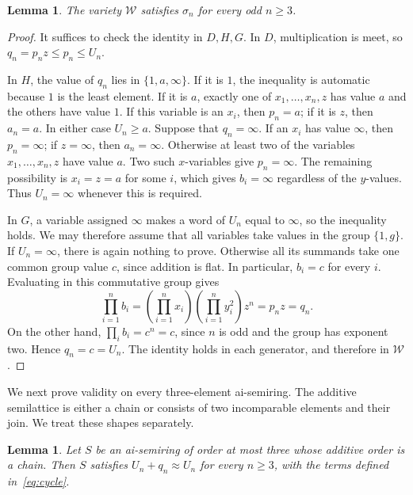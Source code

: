 \documentclass[11pt,reqno]{amsart}
\numberwithin{equation}{section}
\newtheorem{lemma}[theorem]{Lemma}
\theoremstyle{definition}
\theoremstyle{remark}
\newcommand{\W}{\mathcal W}
\newcommand{\eqid}{\approx}
\begin{document}
\begin{lemma}\label{lem:test-valid}
The variety $\W$ satisfies $\sigma_n$ for every odd $n\geq3$.
\end{lemma}

\begin{proof}
It suffices to check the identity in $D,H,G$. In $D$, multiplication
is meet, so $q_n=p_nz\leq p_n\leq U_n$.

In $H$, the value of $q_n$ lies in $\{1,a,\infty\}$.
If it is $1$, the inequality is automatic because $1$ is the least
element. If it is $a$, exactly one of $x_1,\ldots,x_n,z$ has
value $a$ and the others have value $1$. If this variable is an
$x_i$, then $p_n=a$; if it is $z$, then $a_n=a$.
In either case $U_n\geq a$.
Suppose that $q_n=\infty$. If an $x_i$ has value $\infty$,
then $p_n=\infty$; if $z=\infty$, then $a_n=\infty$.
Otherwise at least two of the variables $x_1,\ldots,x_n,z$
have value $a$. Two such $x$-variables give $p_n=\infty$.
The remaining possibility is $x_i=z=a$ for some $i$, which
gives $b_i=\infty$ regardless of the $y$-values. Thus
$U_n=\infty$ whenever this is required.

In $G$, a variable assigned $\infty$ makes a word of $U_n$
equal to $\infty$, so the inequality holds. We may therefore
assume that all variables take values in the group $\{1,g\}$.
If $U_n=\infty$, there is again nothing to prove. Otherwise
all its summands take one common group value $c$, since
addition is flat. In particular, $b_i=c$ for every $i$.
Evaluating in this commutative group gives
\[
\prod_{i=1}^{n}b_i
=\left(\prod_{i=1}^{n}x_i\right)
 \left(\prod_{i=1}^{n}y_i^2\right)z^n
=p_nz=q_n.
\]
On the other hand, $\prod_i b_i=c^n=c$, since $n$ is odd
and the group has exponent two. Hence $q_n=c=U_n$.
The identity holds in each generator, and therefore in $\W$.
\end{proof}

We next prove validity on every three-element ai-semiring. The
additive semilattice is either a chain or consists of two incomparable
elements and their join. We treat these shapes separately.

\begin{lemma}\label{lem:chain-valid}
Let $S$ be an ai-semiring of order at most three whose additive order
is a chain. Then $S$ satisfies $U_n+q_n\eqid U_n$ for every $n\geq3$,
with the terms defined in~\eqref{eq:cycle}.
\end{lemma}
\end{document}
